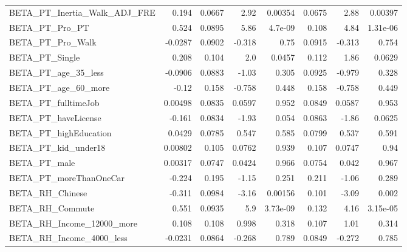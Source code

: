 \begin{tabular}{lrrrrrrr}
BETA\_PT\_Inertia\_Walk\_ADJ\_FRE     &     0.194 &   0.0667 &      2.92 &  0.00354 &        0.0675 &         2.88 &       0.00397 \\
BETA\_PT\_Pro\_PT                   &     0.524 &   0.0895 &      5.86 &  4.7e-09 &         0.108 &         4.84 &      1.31e-06 \\
BETA\_PT\_Pro\_Walk                 &   -0.0287 &   0.0902 &    -0.318 &     0.75 &        0.0915 &       -0.313 &         0.754 \\
BETA\_PT\_Single                   &     0.208 &    0.104 &       2.0 &   0.0457 &         0.112 &         1.86 &        0.0629 \\
BETA\_PT\_age\_35\_less              &   -0.0906 &   0.0883 &     -1.03 &    0.305 &        0.0925 &       -0.979 &         0.328 \\
BETA\_PT\_age\_60\_more              &     -0.12 &    0.158 &    -0.758 &    0.448 &         0.158 &       -0.758 &         0.449 \\
BETA\_PT\_fulltimeJob              &   0.00498 &   0.0835 &    0.0597 &    0.952 &        0.0849 &       0.0587 &         0.953 \\
BETA\_PT\_haveLicense              &    -0.161 &   0.0834 &     -1.93 &    0.054 &        0.0863 &        -1.86 &        0.0625 \\
BETA\_PT\_highEducation            &    0.0429 &   0.0785 &     0.547 &    0.585 &        0.0799 &        0.537 &         0.591 \\
BETA\_PT\_kid\_under18              &   0.00802 &    0.105 &    0.0762 &    0.939 &         0.107 &       0.0747 &          0.94 \\
BETA\_PT\_male                     &   0.00317 &   0.0747 &    0.0424 &    0.966 &        0.0754 &        0.042 &         0.967 \\
BETA\_PT\_moreThanOneCar           &    -0.224 &    0.195 &     -1.15 &    0.251 &         0.211 &        -1.06 &         0.289 \\
BETA\_RH\_Chinese                  &    -0.311 &   0.0984 &     -3.16 &  0.00156 &         0.101 &        -3.09 &         0.002 \\
BETA\_RH\_Commute                  &     0.551 &   0.0935 &       5.9 & 3.73e-09 &         0.132 &         4.16 &      3.15e-05 \\
BETA\_RH\_Income\_12000\_more        &     0.108 &    0.108 &     0.998 &    0.318 &         0.107 &         1.01 &         0.314 \\
BETA\_RH\_Income\_4000\_less         &   -0.0231 &   0.0864 &    -0.268 &    0.789 &        0.0849 &       -0.272 &         0.785 \\

\end{tabular}
